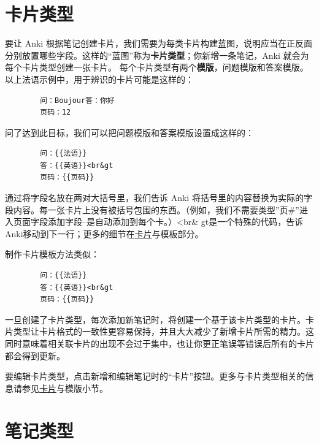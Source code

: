 \documentclass[a4paper]{book}
\begin{document}
	\section{卡片类型}
	
	要让 Anki 根据笔记创建卡片，我们需要为每类卡片构建蓝图，说明应当在正反面分别放置哪些字段。这样的“蓝图”称为\textbf{卡片类型}；你新增一条笔记，Anki 就会为每个卡片类型创建一张卡片。
	每个卡片类型有两个\textbf{模版}，问题模版和答案模版。以上法语示例中，用于辨识的卡片可能是这样的：
	
	\begin{shaded}\begin{verbatim}
		问：Boujour答：你好
		页码：12
		\end{verbatim}\end{shaded}
	
	问了达到此目标，我们可以把问题模版和答案模版设置成这样的：
	
	\begin{shaded}\begin{verbatim}
		问：{{法语}}
		答：{{英语}}<br&gt
		页码：{{页码}}
		\end{verbatim}\end{shaded}
	
	通过将字段名放在两对大括号里，我们告诉 Anki 将括号里的内容替换为实际的字段内容。每一张卡片上没有被括号包围的东西。（例如，我们不需要类型”页\#”进入页面字段添加字段–是自动添加到每个卡。）<br\& gt是一个特殊的代码，告诉Anki移动到下一行；更多的细节在\hyperref[templates]{卡片}与模板部分。
	
	制作卡片模板方法类似：
	
	\begin{shaded}\begin{verbatim}
		问：{{法语}}
		答：{{英语}}<br&gt
		页码：{{页码}}
		\end{verbatim}\end{shaded}
	
	一旦创建了卡片类型，每次添加新笔记时，将创建一个基于该卡片类型的卡片。卡片类型让卡片格式的一致性更容易保持，并且大大减少了新增卡片所需的精力。这同时意味着相关联卡片的出现不会过于集中，也让你更正笔误等错误后所有的卡片都会得到更新。
	
	要编辑卡片类型，点击新增和编辑笔记时的“卡片”按钮。更多与卡片类型相关的信息请参见\hyperref[templates]{卡片}与模版小节。
	
	\section{笔记类型}
	
\end{document}
